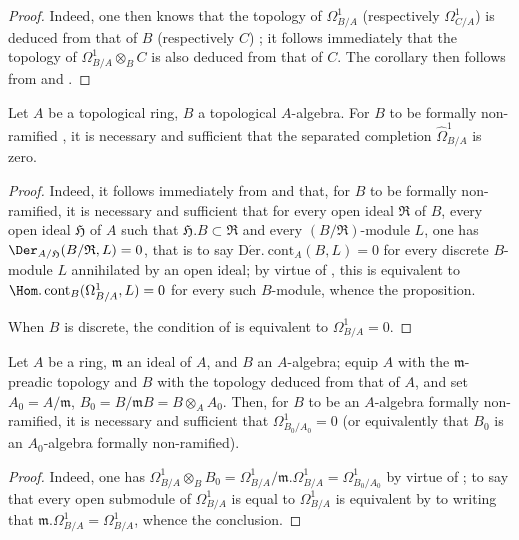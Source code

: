 \begin{proof}
Indeed, one then knows that the topology of $\Omega^1_{B/A}$ (respectively $\Omega^1_{C/A}$) is deduced from that of $B$ (respectively $C$) ; it follows immediately that the topology of $\Omega^1_{B/A}\otimes_B C$ is also deduced from that of $C$. The corollary then follows from  and .
\end{proof}

\begin{proposition}[20.7.4]
\label{0.20.7.4}
Let $A$ be a topological ring, $B$ a topological $A$-algebra.
For $B$ to be formally non-ramified , it is necessary and sufficient that the separated completion $\widehat{\Omega}^1_{B/A}$ is zero.
\end{proposition}

\begin{proof}
Indeed, it follows immediately from  and  that, for $B$ to be formally non-ramified, it is necessary and sufficient that for every open ideal $\mathfrak{R}$ of $B$, every open ideal $\mathfrak{H}$ of $A$ such that $\mathfrak{H}.B\subset\mathfrak{R}$ and every $(B/\mathfrak{R})$-module $L$, one has $\Der_{A/\mathfrak{H}}(B/\mathfrak{R},L)=0$, that is to say $\operatorname{D\acute{e}r.\ cont}_A(B,L)=0$ for every discrete $B$-module $L$ annihilated by an open ideal; by virtue of , this is equivalent to $\Hom.\operatorname{cont}_B(\Omega^1_{B/A},L)=0$ for every such $B$-module, whence the proposition.

When $B$ is discrete, the condition of  is equivalent to $\Omega^1_{B/A}=0$.
\end{proof}

\begin{corollary}[20.7.5]
\label{0.20.7.5}
Let $A$ be a ring, $\mathfrak{m}$ an ideal of $A$, and $B$ an $A$-algebra; equip $A$ with the $\mathfrak{m}$-preadic topology and $B$ with the topology deduced from that of $A$, and set $A_0=A/\mathfrak{m}$, $B_0=B/\mathfrak{m}B=B\otimes_A A_0$.
Then, for $B$ to be an $A$-algebra formally non-ramified, it is necessary and sufficient that $\Omega^1_{B_0/A_0}=0$ \textup{(}or equivalently that $B_0$ is an $A_0$-algebra formally non-ramified\textup{)}.
\end{corollary}

\begin{proof}
Indeed, one has $\Omega^1_{B/A}\otimes_B B_0=\Omega^1_{B/A}/\mathfrak{m}.\Omega^1_{B/A}=\Omega^1_{B_0/A_0}$ by virtue of ; to say that every open submodule of $\Omega^1_{B/A}$ is equal to $\Omega^1_{B/A}$ is equivalent by  to writing that $\mathfrak{m}.\Omega^1_{B/A}=\Omega^1_{B/A}$, whence the conclusion.
\end{proof}

